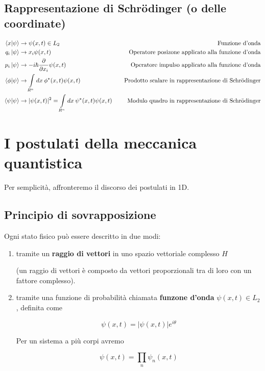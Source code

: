  \subsection{Rappresentazione di Schrödinger (o delle coordinate)}
 \begin{align}
 	\braket{x | \psi} &\rightarrow \psi(x,t) \in L_2 \quad &\text{Funzione d'onda}\\
 	q_i\ket{\psi} &\rightarrow x_i\psi(x,t) \quad &\text{Operatore posizone applicato alla funzione d'onda}\\
 	p_i\ket{\psi} &\rightarrow -i\hbar \frac{\partial}{\partial x_i}  \psi(x,t) \quad &\text{Operatore impulso applicato alla funzione d'onda}\\
 	\braket{\phi | \psi} &\rightarrow \int \limits_{R^n} dx \: \phi^*(x,t)\psi(x,t) \quad &\text{Prodotto scalare in rappresentazione di Schrödinger}\\
 	\braket{\psi | \psi} &\rightarrow |\psi(x,t)|^2 = \int \limits_{R^n} dx \: \psi^*(x,t)\psi(x,t) \quad &\text{Modulo quadro in rappresentazione di Schrödinger}
 \end{align}
 
\newpage

\section{I postulati della meccanica quantistica}

Per semplicità, affronteremo il discorso dei postulati in 1D. 

\subsection{Principio di sovrapposizione}
	Ogni stato fisico può essere descritto in due modi:
	
	\begin{enumerate}
		
		\item tramite un \textbf{raggio di vettori} in uno spazio vettoriale complesso $H$ 
		
		(un raggio di vettori è composto da vettori proporzionali tra di loro con un fattore complesso).
		
		\item tramite una funzione di probabilità chiamata \textbf{funzone d'onda} $\psi(x,t) \in L_2$, definita come
	
	\begin{equation}
	\psi(x,t)= |\psi(x,t)|e^{i\theta}
	\end{equation}
	
	Per un sistema a più corpi avremo
		
	\begin{equation}
	\psi(x,t)= \prod_{n} \psi_n(x,t)
	\end{equation}
	\end{enumerate}

